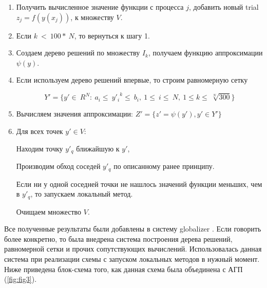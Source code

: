 \documentclass[12pt, a4paper, russian]{article}
\begin{document}
\begin{enumerate}
	\item  Получить вычисленное  значение функции с процесса $j$, добавить новый trial $z_j = f(y(x_j))$, к множеству $V$. 



	\item 	Если $ k\ <\ 100\ast\ N$, то вернуться к шагу 1.


	\item Создаем дерево решений по множеству $I_k$, получаем функцию аппроксимации  $\psi(y)$.



	\item 	Если используем дерево решений впервые, то строим равномерную сетку

	\begin{displaymath}
	Y'=\{ y'\in\ R^N:\ a_i\le\  {y'_i}^k \le\ b_i,\ 1\le\ i\le\ N,\ 1\le k\le\ \sqrt[N]{300}  \}
	\end{displaymath}

	\item 	Вычисляем значения аппроксимации: $Z' = \{ z'=  \psi(y'), y' \in Y'\}$

	\item Для всех точек $y'\in V$:

	Находим точку $y'_q$ ближайшую  к $y'$,

	Производим обход соседей $y'_q$ по описанному ранее принципу.

	Если ни у одной соседней точки не нашлось значений функции меньших, чем в $y'_q$, то запускаем локальный метод.

	Очищаем множество $V$.


\end{enumerate}




Все полученные результаты были добавлены в систему globalizer \cite{fio_bib18}.
Если говорить более конкретно, то была внедрена система  построения дерева решений, равномерной сетки и прочих сопутствующих вычислений. Использовалась данная система при реализации схемы с запуском локальных методов в нужный момент.  
Ниже приведена блок-схема того, как данная схема была объединена с АГП (\ref{fig:fig3}).
\end{document}
